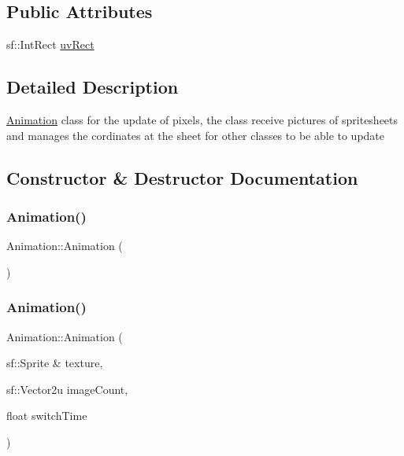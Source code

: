 \subsection*{Public Attributes}
\begin{DoxyCompactItemize}
\item 
sf\+::\+Int\+Rect \mbox{\hyperlink{classAnimation_a82c41dd15d9a98ecc0699ecca09fd056}{uv\+Rect}}
\end{DoxyCompactItemize}


\subsection{Detailed Description}
\mbox{\hyperlink{classAnimation}{Animation}} class for the update of pixels, the class receive pictures of spritesheets and manages the cordinates at the sheet for other classes to be able to update 

\subsection{Constructor \& Destructor Documentation}
\mbox{\label{classAnimation_a4c733083ff6e7c04ad06d73b5ccef398}} 
\subsubsection{\texorpdfstring{Animation()}{Animation()}\hspace{0.1cm}{\footnotesize\ttfamily [1/2]}}
{\footnotesize\ttfamily Animation\+::\+Animation (\begin{DoxyParamCaption}{ }\end{DoxyParamCaption})\hspace{0.3cm}{\ttfamily [delete]}}

\mbox{\label{classAnimation_aa8aaf286b114298e3ecbe1fc62572c27}} 
\subsubsection{\texorpdfstring{Animation()}{Animation()}\hspace{0.1cm}{\footnotesize\ttfamily [2/2]}}
{\footnotesize\ttfamily Animation\+::\+Animation (\begin{DoxyParamCaption}\item[{sf\+::\+Sprite \&}]{texture,  }\item[{sf\+::\+Vector2u}]{image\+Count,  }\item[{float}]{switch\+Time }\end{DoxyParamCaption})}




